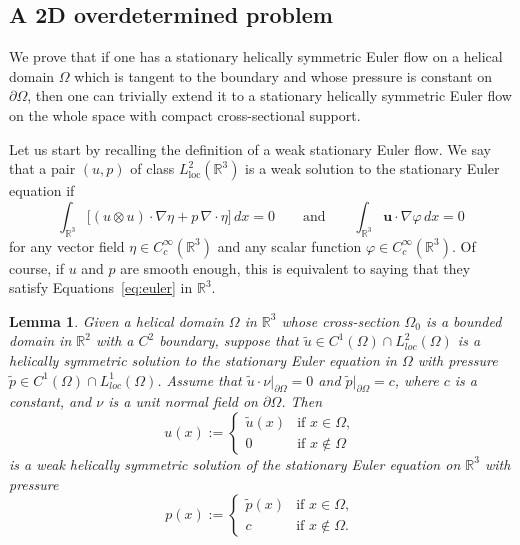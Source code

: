 \documentclass[12pt,reqno]{amsart}
\numberwithin{equation}{section}
\newtheorem{lemma}[theorem]{Lemma}
\theoremstyle{definition}
\theoremstyle{remark}
\begin{document}
\subsection{A 2D overdetermined problem}
We prove that if one has a stationary helically symmetric Euler flow on a helical  domain $\varOmega$ which is tangent to the boundary and whose pressure is constant on $\partial\varOmega$, then one can trivially extend it to a stationary helically symmetric Euler flow on the whole space with compact cross-sectional support.

Let us start by recalling the definition of a weak stationary Euler flow.
We say that a pair $(u,p)$ of class  $L^2_{\mathrm{loc}}(\mathbb{R}^3)$ is a weak solution to the stationary Euler equation if
\[
\int_{\mathbb{R}^3} \bigl[ (u\otimes u) \cdot \nabla \eta + p\,\nabla\cdot \eta \bigr] \,dx = 0
\qquad\text{and}\qquad
\int_{\mathbb{R}^3} \mathbf{u} \cdot \nabla \varphi \,dx = 0
\]
for any vector field $\eta\in C^\infty_c(\mathbb{R}^3)$ and any scalar function $\varphi\in C^\infty_c(\mathbb{R}^3)$.
Of course, if $u$ and $p$ are smooth enough, this is equivalent to saying that they satisfy Equations~\eqref{eq:euler} in $\mathbb{R}^3$.

\begin{lemma}\label{lem:general}
	Given a helical domain $\varOmega$ in $\mathbb{R}^3$ whose cross-section $\varOmega_0$ is a bounded domain in $ \mathbb{R}^2 $ with  a $C^2$ boundary, suppose that $\tilde u\in C^1(\varOmega)\cap L^2_{loc}(\varOmega)$ is a helically symmetric solution to the stationary Euler equation in $\varOmega$ with pressure $\tilde p\in C^1(\varOmega)\cap L^1_{loc}(\varOmega)$.
	Assume that $\tilde u\cdot\nu |_{\partial\varOmega}=0$ and $\tilde p|_{\partial\varOmega}=c$, where $c$ is a constant,  and $ \nu $ is a unit normal field on $ \partial\varOmega $.
	Then
	\[
	u(x) :=
	\begin{cases}
	\tilde u(x) & \text{if } x\in\varOmega ,\\
	0 & \text{if } x\notin\varOmega
	\end{cases}
	\]
	is a weak helically symmetric solution of the stationary Euler equation on $\mathbb{R}^3$ with pressure
	\[
	p(x) :=
	\begin{cases}
	\tilde p(x) & \text{if } x\in\varOmega ,\\
	c & \text{if } x\notin\varOmega .
	\end{cases}
	\]
\end{lemma}
\end{document}

